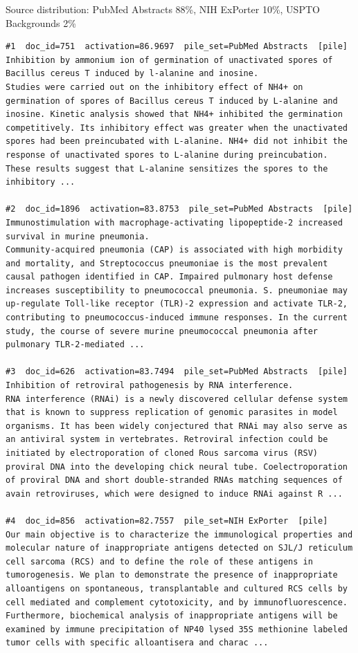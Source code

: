 Source distribution: PubMed Abstracts 88\%, NIH ExPorter 10\%, USPTO Backgrounds 2\%

\begin{verbatim}
#1  doc_id=751  activation=86.9697  pile_set=PubMed Abstracts  [pile]
Inhibition by ammonium ion of germination of unactivated spores of Bacillus cereus T induced by l-alanine and inosine.
Studies were carried out on the inhibitory effect of NH4+ on germination of spores of Bacillus cereus T induced by L-alanine and inosine. Kinetic analysis showed that NH4+ inhibited the germination competitively. Its inhibitory effect was greater when the unactivated spores had been preincubated with L-alanine. NH4+ did not inhibit the response of unactivated spores to L-alanine during preincubation. These results suggest that L-alanine sensitizes the spores to the inhibitory ...

#2  doc_id=1896  activation=83.8753  pile_set=PubMed Abstracts  [pile]
Immunostimulation with macrophage-activating lipopeptide-2 increased survival in murine pneumonia.
Community-acquired pneumonia (CAP) is associated with high morbidity and mortality, and Streptococcus pneumoniae is the most prevalent causal pathogen identified in CAP. Impaired pulmonary host defense increases susceptibility to pneumococcal pneumonia. S. pneumoniae may up-regulate Toll-like receptor (TLR)-2 expression and activate TLR-2, contributing to pneumococcus-induced immune responses. In the current study, the course of severe murine pneumococcal pneumonia after pulmonary TLR-2-mediated ...

#3  doc_id=626  activation=83.7494  pile_set=PubMed Abstracts  [pile]
Inhibition of retroviral pathogenesis by RNA interference.
RNA interference (RNAi) is a newly discovered cellular defense system that is known to suppress replication of genomic parasites in model organisms. It has been widely conjectured that RNAi may also serve as an antiviral system in vertebrates. Retroviral infection could be initiated by electroporation of cloned Rous sarcoma virus (RSV) proviral DNA into the developing chick neural tube. Coelectroporation of proviral DNA and short double-stranded RNAs matching sequences of avain retroviruses, which were designed to induce RNAi against R ...

#4  doc_id=856  activation=82.7557  pile_set=NIH ExPorter  [pile]
Our main objective is to characterize the immunological properties and molecular nature of inappropriate antigens detected on SJL/J reticulum cell sarcoma (RCS) and to define the role of these antigens in tumorogenesis. We plan to demonstrate the presence of inappropriate alloantigens on spontaneous, transplantable and cultured RCS cells by cell mediated and complement cytotoxicity, and by immunofluorescence. Furthermore, biochemical analysis of inappropriate antigens will be examined by immune precipitation of NP40 lysed 35S methionine labeled tumor cells with specific alloantisera and charac ...


\end{verbatim}
